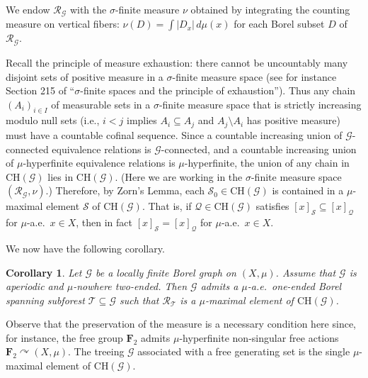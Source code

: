 \documentclass[11pt]{amsart}
\theoremstyle{definition}
\theoremstyle{plain}
\newtheorem{corollary}[definition]{Corollary}
\newcommand{\<}{\langle}
\renewcommand{\>}{\rangle}
\newcommand{\actson}{\curvearrowright}
\newcommand{\FF}{\mathbf{F}}
\newcommand{\Ggraph}{\mathcal{G}}
\newcommand{\Tgraph}{\mathcal{T}}
\newcommand{\pmp}{\text{p.m.p.}}
\newcommand\RR{\mathscr{R}}
\begin{document}
We endow $\RR_{\Ggraph}$ with the $\sigma$-finite measure $\nu$ obtained by integrating the counting measure on vertical fibers: $\nu (D)=\int |D_x|\, d\mu (x)$ for each Borel subset $D$ of $\RR_{\Ggraph}$.

Recall the principle of measure exhaustion: there cannot be uncountably many disjoint sets of positive measure in a $\sigma$-finite measure space (see for instance Section 215 of \cite{Fremlin-vol2-2003} ``$\sigma$-finite spaces and the principle of exhaustion'').
Thus any chain $(A_i)_{i\in I}$ of measurable sets in a $\sigma$-finite measure space that is strictly increasing modulo null sets (i.e., $i< j$ implies $A_i\subseteq A_j$ and $A_j\setminus A_i$ has positive measure) must have a countable cofinal sequence.
Since a countable increasing union of $\Ggraph$-connected equivalence relations is $\Ggraph$-connected, and a countable increasing union of $\mu$-hyperfinite equivalence relations is $\mu$-hyperfinite, the union of any chain in $\mathrm{CH}(\Ggraph)$ lies in $\mathrm{CH}(\Ggraph)$. (Here we are working in the $\sigma$-finite measure space $(\RR_\Ggraph ,\nu )$.)
Therefore, by Zorn's Lemma, each $\mathcal{S}_0\in \mathrm{CH}(\Ggraph)$ is contained in a $\mu$-maximal element $\mathcal{S}$ of $\mathrm{CH}(\Ggraph)$. 
That is, if $\mathcal{Q}\in \mathrm{CH}(\Ggraph)$ satisfies $[x]_{\mathcal{S}}\subseteq [x]_{\mathcal{Q}}$ for $\mu$-a.e.\ $x\in X$, then in fact $[x]_{\mathcal{S}}= [x]_{\mathcal{Q}}$ for $\mu$-a.e.\ $x\in X$.

We now have the following corollary.

\begin{corollary}\label{cor:maximal}
Let $\Ggraph$ be a \pmp{} locally finite Borel graph on $(X,\mu )$. Assume that $\Ggraph$ is aperiodic and $\mu$-nowhere two-ended. Then $\Ggraph$ admits a $\mu$-a.e.\ one-ended Borel spanning subforest $\Tgraph\subseteq \Ggraph$ such that $\RR_{\Tgraph}$ is a $\mu$-maximal element of $\mathrm{CH}(\Ggraph)$.
\end{corollary}
Observe that the preservation of the measure is a necessary condition here since, for instance, the free group $\FF_2$ admits $\mu$-hyperfinite non-singular free actions $\FF_2\actson (X,\mu)$. The treeing $\Ggraph$ associated with a free generating set is the single $\mu$-maximal element of $\mathrm{CH}(\Ggraph)$.
\end{document}
